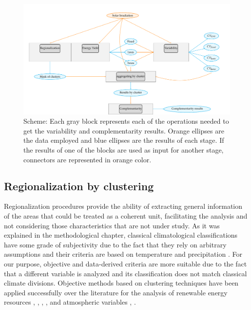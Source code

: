 \begin{figure}[h!]
\centering\includegraphics[width=1\textwidth]{figs/capitulo5/multi_step}
\caption{Scheme: Each gray block represents each of the operations needed to get the variability and complementarity results. Orange ellipses are the data employed and blue ellipses are the results of each stage. If the results of one of the blocks are used as input for another stage, connectors are represented in orange color.}
\label{fig:multi_step}
\end{figure}

\subsection{Regionalization by clustering}

Regionalization procedures provide the ability of extracting general information of the areas that could be treated as a coherent unit, facilitating the analysis and not considering those characteristics that are not under study. As it was explained in the methodological chapter, classical climatological classifications have some grade of subjectivity due to the fact that they rely on arbitrary assumptions \cite*{Kottek2006} and their criteria are based on temperature and precipitation \cite*{trewartha1980koppen}. For our purpose, objective and data-derived criteria are more suitable due to the fact that a different variable is analyzed and its classification does not match classical climate divisions. Objective methods based on clustering techniques have been applied successfully over the literature for the analysis of renewable energy resources \cite*{Polo2015}, \cite*{Zagouras2013}, \cite*{Zagouras2014}, \cite*{Zagouras2014b}, \cite*{gomez2015characterization} and atmospheric variables \cite*{Argueso2011}, \cite*{garcia2012seasonal}. 

